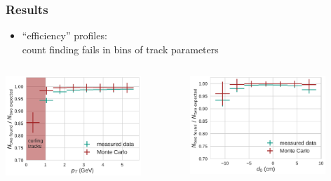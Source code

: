 \documentclass[18pt, aspectratio=169]{beamer}
\newcommand{\rowstyle}[1]{%
  \protected\gdef\currentrowstyle{#1}%
}
\begin{document}
\begin{frame}
  \frametitle{Results}
  \begin{itemize}
  \item ``efficiency'' profiles:\\count finding fails in bins of track parameters
  \end{itemize}
  \begin{columns}
    \begin{column}{0.5\textwidth}
      \centering
      \includegraphics[width=0.8\textwidth]{figures/efficiency_study/cosmicbased_findeff_over_pt_annotated.pdf}
    \end{column}
    \begin{column}{0.5\textwidth}
      \centering
      \includegraphics[width=0.8\textwidth]{figures/efficiency_study/cosmicbased_findeff_over_d0.pdf}

\end{column}
\end{columns}
\end{frame}
\end{document}
